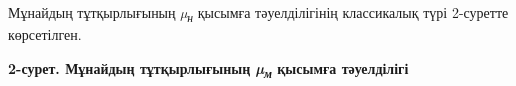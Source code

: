 
Мұнайдың тұтқырлығының \emph{µ\textsubscript{н}} қысымға тәуелділігінің
классикалық түрі 2-суретте көрсетілген.

{\bfseries 2-сурет. Мұнайдың тұтқырлығының \emph{µ\textsubscript{м}}
қысымға тәуелділігі}

